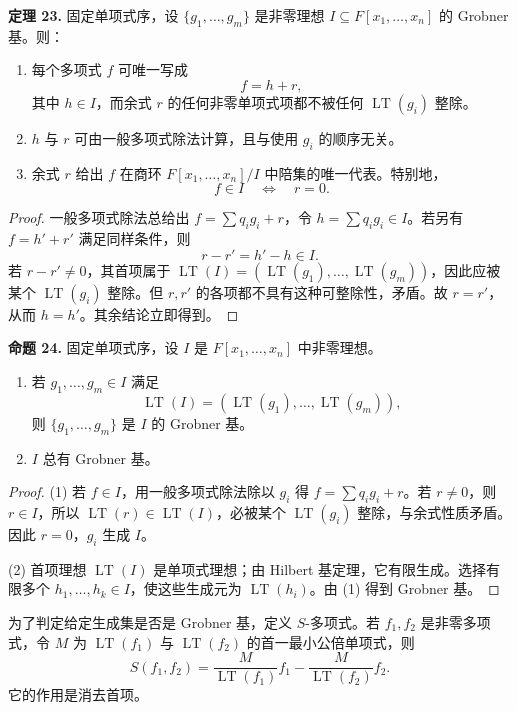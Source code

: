 \noindent\textbf{定理 23.} 固定单项式序，设 $\{g_1,\ldots,g_m\}$ 是非零理想 $I\subseteq F[x_1,\ldots,x_n]$ 的 Grobner 基。则：
\begin{enumerate}[label=(\arabic*)]
	\item 每个多项式 $f$ 可唯一写成
	\[
	f=h+r,
	\]
	其中 $h\in I$，而余式 $r$ 的任何非零单项式项都不被任何 $\operatorname{LT}(g_i)$ 整除。
	\item $h$ 与 $r$ 可由一般多项式除法计算，且与使用 $g_i$ 的顺序无关。
	\item 余式 $r$ 给出 $f$ 在商环 $F[x_1,\ldots,x_n]/I$ 中陪集的唯一代表。特别地，
	\[
	f\in I \quad\Longleftrightarrow\quad r=0.
	\]
\end{enumerate}

\begin{proof}
	一般多项式除法总给出 $f=\sum q_i g_i+r$，令 $h=\sum q_i g_i\in I$。若另有 $f=h'+r'$ 满足同样条件，则
	\[
	r-r'=h'-h\in I.
	\]
	若 $r-r'\neq0$，其首项属于 $\operatorname{LT}(I)=(\operatorname{LT}(g_1),\ldots,\operatorname{LT}(g_m))$，因此应被某个 $\operatorname{LT}(g_i)$ 整除。但 $r,r'$ 的各项都不具有这种可整除性，矛盾。故 $r=r'$，从而 $h=h'$。其余结论立即得到。
\end{proof}

\noindent\textbf{命题 24.} 固定单项式序，设 $I$ 是 $F[x_1,\ldots,x_n]$ 中非零理想。
\begin{enumerate}[label=(\arabic*)]
	\item 若 $g_1,\ldots,g_m\in I$ 满足
	\[
	\operatorname{LT}(I)=(\operatorname{LT}(g_1),\ldots,\operatorname{LT}(g_m)),
	\]
	则 $\{g_1,\ldots,g_m\}$ 是 $I$ 的 Grobner 基。
	\item $I$ 总有 Grobner 基。
\end{enumerate}

\begin{proof}
	(1) 若 $f\in I$，用一般多项式除法除以 $g_i$ 得 $f=\sum q_i g_i+r$。若 $r\neq0$，则 $r\in I$，所以 $\operatorname{LT}(r)\in\operatorname{LT}(I)$，必被某个 $\operatorname{LT}(g_i)$ 整除，与余式性质矛盾。因此 $r=0$，$g_i$ 生成 $I$。
	
	(2) 首项理想 $\operatorname{LT}(I)$ 是单项式理想；由 Hilbert 基定理，它有限生成。选择有限多个 $h_1,\ldots,h_k\in I$，使这些生成元为 $\operatorname{LT}(h_i)$。由 (1) 得到 Grobner 基。
\end{proof}

为了判定给定生成集是否是 Grobner 基，定义 $S$-多项式。若 $f_1,f_2$ 是非零多项式，令 $M$ 为 $\operatorname{LT}(f_1)$ 与 $\operatorname{LT}(f_2)$ 的首一最小公倍单项式，则
\[
S(f_1,f_2)=\frac{M}{\operatorname{LT}(f_1)}f_1-
\frac{M}{\operatorname{LT}(f_2)}f_2.
\]
它的作用是消去首项。

